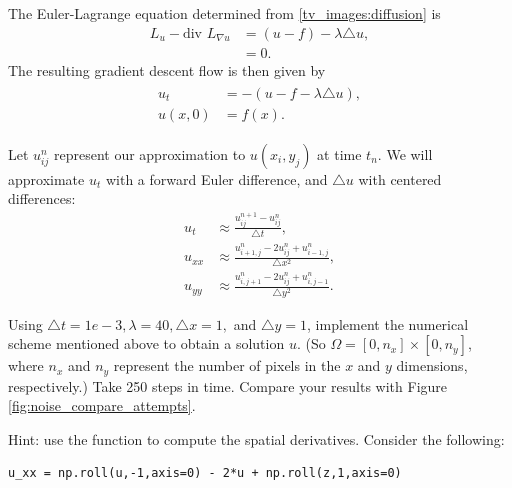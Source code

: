 The Euler-Lagrange equation determined from \eqref{tv_images:diffusion} is
\begin{align*}
L_u - \text{div } L_{\nabla u} &= (u-f) - \lambda \triangle u,\\
&= 0.
\end{align*}
The resulting gradient descent flow is then given by 
\begin{align}
	\begin{split}
u_t &= -(u-f -\lambda \triangle u),\\
u(x,0) &= f(x).	
	\end{split} \label{tv_images:diffusion_flow}
\end{align}

Let $u_{ij}^n$ represent our approximation to $u(x_i,y_j)$ at time $t_n$. We will approximate $u_t$ with a forward Euler difference, and $\triangle u$ with centered differences: 
\begin{align*}
	u_t &\approx \frac{u_{ij}^{n+1}-u_{ij}^n}{\triangle t},\\
	u_{xx} &\approx \frac{u_{i+1,j}^{n}-2u_{ij}^n + u_{i-1,j}^n}{\triangle x^2}, \\
	u_{yy} &\approx \frac{u_{i,j+1}^{n}-2u_{ij}^n + u_{i,j-1}^n}{\triangle y^2}.
\end{align*}


\begin{problem}
Using $\triangle t = 1e-3, \lambda = 40, \triangle x = 1,$ and $ \triangle y = 1$, implement the numerical scheme mentioned above to obtain a solution $u$. (So $\Omega = [0,n_x]\times [0,n_y]$, where $n_x$ and $n_y$ represent the number of pixels in the $x$ and $y$ dimensions, respectively.) Take 250 steps in time. Compare your results with Figure \ref{fig:noise_compare_attempts}.

Hint: use the function  to compute the spatial derivatives. Consider the following: 
\begin{lstlisting}
u_xx = np.roll(u,-1,axis=0) - 2*u + np.roll(z,1,axis=0)	
\end{lstlisting}
\end{problem}




